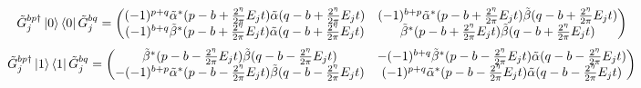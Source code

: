 \documentclass[aps,floatfix,10pt,amssymb,amsfont,amsmath,superscriptaddress,float,nofootinbib,longbibliography,nobalancelastpage,twocolumn]{revtex4-2}
\begin{document}
\begin{widetext}
\begin{equation}
    \tilde G^{bp\dagger}_{j}\ket{0}\bra{0} \tilde G^{bq}_{j} = \begin{pmatrix}
        (-1)^{p+q}\tilde \alpha^*(p-b+\frac{2^{\eta}}{2\pi}E_{j}t)\tilde  \alpha(q-b+\frac{2^{\eta}}{2\pi}E_{j}t) &(-1)^{b+p}\tilde  \alpha^*(p-b+\frac{2^{\eta}}{2\pi}E_{j}t)\tilde  \beta(q-b+\frac{2^{\eta}}{2\pi}E_{j}t)  \\(-1)^{b+q}\tilde  \beta^*(p-b+\frac{2^{\eta}}{2\pi}E_{j}t)\tilde  \alpha(q-b+\frac{2^{\eta}}{2\pi}E_{j}t) & \tilde  \beta^*(p-b+\frac{2^{\eta}}{2\pi}E_{j}t)\tilde  \beta(q-b+\frac{2^{\eta}}{2\pi}E_{j}t)
    \end{pmatrix}
\end{equation} 
\begin{equation}
    \tilde G^{bp\dagger}_{j}\ket{1}\bra{1} \tilde G^{bq}_{j} = \begin{pmatrix}
        \tilde \beta^*(p-b-\frac{2^{\eta}}{2\pi}E_{j}t)\tilde  \beta(q-b-\frac{2^{\eta}}{2\pi}E_{j}t) &  -(-1)^{b+q}\tilde  \beta^*(p-b-\frac{2^{\eta}}{2\pi}E_{j}t)\tilde \alpha(q-b-\frac{2^{\eta}}{2\pi}E_{j}t) \\
        -(-1)^{b+p}\tilde  \alpha^*(p-b-\frac{2^{\eta}}{2\pi}E_{j}t)\tilde  \beta(q-b-\frac{2^{\eta}}{2\pi}E_{j}t) & (-1)^{p+q}\tilde  \alpha^*(p-b-\frac{2^{\eta}}{2\pi}E_{j}t)\tilde \alpha(q-b-\frac{2^{\eta}}{2\pi}E_{j}t)
    \end{pmatrix}
\end{equation} 

\end{widetext}
\end{document}
